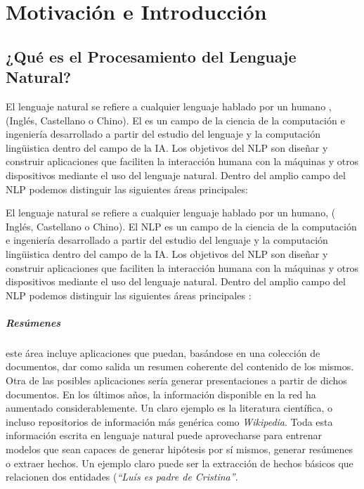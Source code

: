 \chapter{Motivación e Introducción}\label{ch:introduction}


\section{¿Qué es el Procesamiento del Lenguaje Natural?}
\label{sec:whatisnlp}

El lenguaje natural se refiere a cualquier lenguaje hablado por un
humano \cite{James2012}, (\eg Inglés, Castellano o
Chino). El  es un campo de la ciencia
de la computación e ingeniería desarrollado a partir del estudio del lenguaje y
la computación lingüistica dentro del campo de la \ac{IA}. Los objetivos del
\ac{NLP} son diseñar y construir aplicaciones que faciliten la interacción
humana con la máquinas y otros dispositivos mediante el uso del lenguaje
natural. Dentro del amplio campo del \ac{NLP} podemos distinguir las siguientes
áreas principales:

El lenguaje natural se refiere a cualquier lenguaje hablado por un humano, (\eg
Inglés, Castellano o Chino). El \ac{NLP} es un campo de la ciencia de la
computación e ingeniería desarrollado a partir del estudio del lenguaje y la
computación lingüistica dentro del campo de la \ac{IA}. Los objetivos del
\ac{NLP} son diseñar y construir aplicaciones que faciliten la interacción
humana con la máquinas y otros dispositivos mediante el uso del lenguaje
natural. Dentro del amplio campo del \ac{NLP} podemos distinguir las siguientes
áreas principales \cite{Hirschberg2015, James2012}:

\paragraph{Resúmenes} este área incluye aplicaciones que puedan, basándose en
una colección de documentos, dar como salida un resumen coherente del contenido
de los mismos. Otra de las posibles aplicaciones sería generar presentaciones a
partir de dichos documentos. En los últimos años, la información disponible en
la red ha aumentado considerablemente. Un claro ejemplo es la literatura
científica, o incluso repositorios de información más genérica como
\emph{Wikipedia}. Toda esta información escrita en lenguaje natural puede
aprovecharse para entrenar modelos que sean capaces de generar hipótesis por sí
mismos, generar resúmenes o extraer hechos. Un ejemplo claro puede ser la
extracción de hechos básicos que relacionen dos entidades (\emph{``Luís es padre
de Cristina''}.

